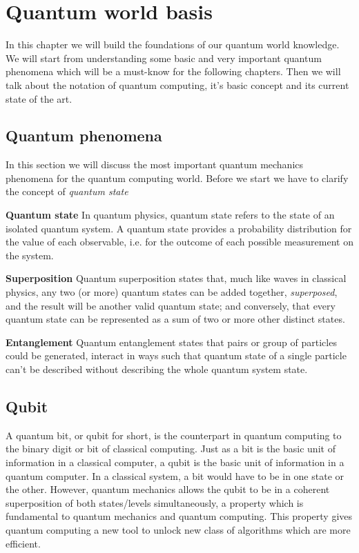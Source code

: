 \documentclass[main.tex]{subfiles}
\begin{document}
\section{Quantum world basis}
In this chapter we will build the foundations of our quantum world knowledge.
We will start from understanding some basic and very important quantum phenomena which will be 
a must-know for the following chapters. Then we will talk about the notation of quantum computing, it's 
basic concept and its current state of the art.
	\subsection{Quantum phenomena}
	In this section we will discuss the most important quantum mechanics phenomena for the quantum computing world.
	Before we start we have to clarify the concept of \textit{quantum state}
	
	\theoremstyle{definition}
	\begin{definition}{\textbf{Quantum state}}
	In quantum physics, quantum state refers to the state of an isolated quantum system. A quantum state provides a probability 
	distribution for the value of each observable, i.e. for the outcome of each possible measurement on the system.
	\end{definition}
	
	\theoremstyle{definition}
	\begin{definition}{\textbf{Superposition}}
	Quantum superposition states that, much like waves in classical physics, 
	any two (or more) quantum states can be added together, \textit{superposed}, and the result will be another valid quantum state; 
	and conversely, that every quantum state can be represented as a sum of two or more other distinct states.
	\end{definition}
	
	\theoremstyle{definition}
	\begin{definition}{\textbf{Entanglement}}
	Quantum entanglement states that pairs or group of particles could be generated, interact in ways such that quantum state of a 
	single particle can't be described without describing the whole quantum system state.
	\end{definition}
		
	\subsection{Qubit}
	A quantum bit, or qubit for short, is the counterpart in quantum computing to the binary digit or bit of classical computing. 
	Just as a bit is the basic unit of information in a classical computer, a qubit is the basic unit of information 
	in a quantum computer. In a classical system, a bit would have to be in one state or the other. However, quantum mechanics allows
	the qubit to be in a coherent superposition of both states/levels simultaneously, a property which is fundamental to quantum
	mechanics and quantum computing. This property gives quantum computing a new tool to unlock new class of algorithms which are 
	more efficient.
	
\end{document}
